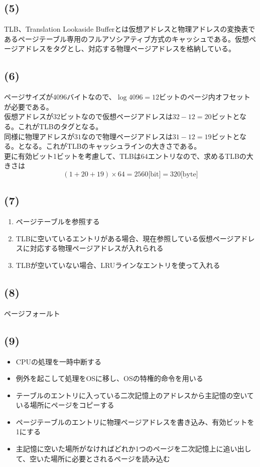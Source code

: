 \documentclass[a4paper,12pt,xelatex,ja=standard]{bxjsarticle}
\begin{document}
\subsection*{(5)}
TLB、Translation Lookaside Bufferとは仮想アドレスと物理アドレスの変換表であるページテーブル専用のフルアソシアティブ方式のキャッシュである。仮想ページアドレスをタグとし、対応する物理ページアドレスを格納している。

\subsection*{(6)}
ページサイズが$4096$バイトなので、$\log 4096 = 12$ビットのページ内オフセットが必要である。\\
仮想アドレスが$32$ビットなので仮想ページアドレスは$32 - 12 = 20$ビットとなる。これがTLBのタグとなる。\\
同様に物理アドレスが$31$なので物理ページアドレスは$31 - 12 = 19$ビットとなる。となる。これがTLBのキャッシュラインの大きさである。\\
更に有効ビット1ビットを考慮して、TLBは64エントリなので、求めるTLBの大きさは
\[
  (1 + 20 + 19) \times 64 = 2560\text{[bit]} = 320\text{[byte]}
\]

\subsection*{(7)}
\begin{enumerate}
  \item ページテーブルを参照する
  \item TLBに空いているエントリがある場合、現在参照している仮想ページアドレスに対応する物理ページアドレスが入れられる
  \item TLBが空いていない場合、LRUラインなエントリを使って入れる
\end{enumerate}

\subsection*{(8)}
ページフォールト

\subsection*{(9)}
\begin{itemize}
  \item CPUの処理を一時中断する
  \item 例外を起こして処理をOSに移し、OSの特権的命令を用いる
  \item テーブルのエントリに入っている二次記憶上のアドレスから主記憶の空いている場所にページをコピーする
  \item ページテーブルのエントリに物理ページアドレスを書き込み、有効ビットを1にする
  \item 主記憶に空いた場所がなければどれか1つのページを二次記憶上に追い出して、空いた場所に必要とされるページを読み込む
\end{itemize}
\end{document}
